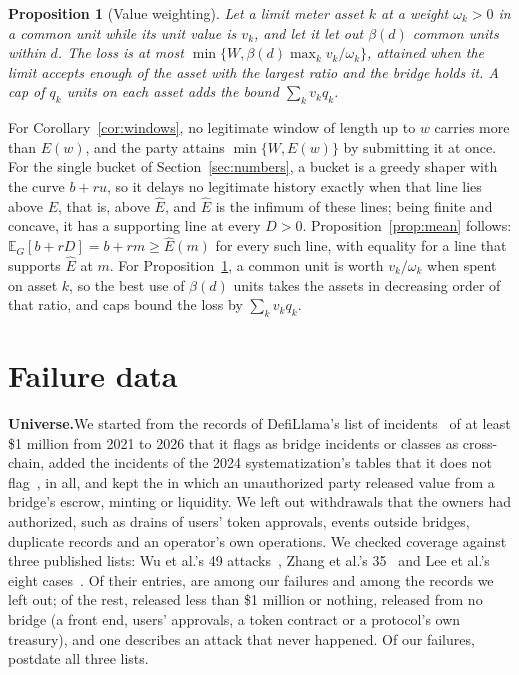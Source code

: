 \documentclass[conference,compsoc]{IEEEtran}
\numberwithin{equation}{section}
\theoremstyle{plain}
\newtheorem{proposition}[theorem]{Proposition}
\theoremstyle{definition}
\theoremstyle{remark}
\newcommand{\runin}[1]{\par\smallskip\noindent\textbf{#1.}\enspace}
\begin{document}
\begin{proposition}[Value weighting]\label{prop:weights}
Let a limit meter asset $k$ at a weight $\omega_k > 0$ in a common unit while its unit value is $v_k$, and let it let out $\beta(d)$ common units within $d$. The loss is at most $\min\{W, \beta(d) \max_k v_k / \omega_k\}$, attained when the limit accepts enough of the asset with the largest ratio and the bridge holds it. A cap of $q_k$ units on each asset adds the bound $\sum_k v_k q_k$.
\end{proposition}

For Corollary~\ref{cor:windows}, no legitimate window of length up to $w$ carries more than $E(w)$, and the party attains $\min\{W, E(w)\}$ by submitting it at once. For the single bucket of Section~\ref{sec:numbers}, a bucket is a greedy shaper with the curve $b + ru$, so it delays no legitimate history exactly when that line lies above $E$, that is, above $\hat{E}$, and $\hat{E}$ is the infimum of these lines; being finite and concave, it has a supporting line at every $D > 0$. Proposition~\ref{prop:mean} follows: $\mathbb{E}_G[b + rD] = b + rm \ge \hat{E}(m)$ for every such line, with equality for a line that supports $\hat{E}$ at $m$. For Proposition~\ref{prop:weights}, a common unit is worth $v_k/\omega_k$ when spent on asset $k$, so the best use of $\beta(d)$ units takes the assets in decreasing order of that ratio, and caps bound the loss by $\sum_k v_k q_k$.

\section{Failure data}\label{app:events}

\runin{Universe}We started from the records of DefiLlama's list of incidents~\cite{defillama_hacks} of at least \$1 million from 2021 to 2026 that it flags as bridge incidents or classes as cross-chain, added the incidents of the 2024 systematization's tables that it does not flag~\cite{augusto2024sok}, \nRecords{} in all, and kept the \nEvents{} in which an unauthorized party released value from a bridge's escrow, minting or liquidity. We left out withdrawals that the owners had authorized, such as drains of users' token approvals, events outside bridges, duplicate records and an operator's own operations. We checked coverage against three published lists: Wu et al.'s 49 attacks~\cite{wu2025bridgeguard}, Zhang et al.'s 35~\cite{zhang2024bridges} and Lee et al.'s eight cases~\cite{lee2023bridgehacks}. Of their \coverEntries{} entries, \coverMatched{} are among our failures and \coverLeftOut{} among the records we left out; of the rest, \coverSmall{} released less than \$1 million or nothing, \coverNotBridge{} released from no bridge (a front end, users' approvals, a token contract or a protocol's own treasury), and one describes an attack that never happened. Of our failures, \coverAfter{} postdate all three lists.
\end{document}

